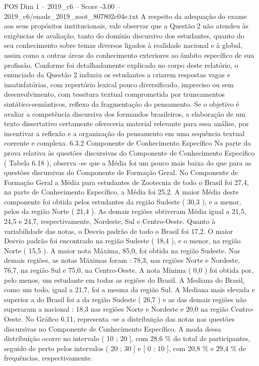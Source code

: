 \begin{textsample}{POS Dim 1 – 2019\_c6 – Score -3.00 – 2019\_c6/enade\_2019\_zoot\_807802c04e.txt}
A respeito da adequação do exame aos seus propósitos institucionais, vale observar que a Questão 2 não atendeu às exigências de avaliação, tanto do domínio discursivo dos estudantes, quanto do seu conhecimento sobre temas diversos ligados à realidade nacional e à global, assim como a outras áreas do conhecimento exteriores ao âmbito específico de sua profissão.
Conforme foi detalhadamente explicado no corpo deste relatório, o enunciado da Questão 2 induziu os estudantes a criarem respostas vagas e insatisfatórias, com repertório lexical pouco diversificado, impreciso ou sem desenvolvimento, com tessitura textual comprometida por truncamentos sintático-semânticos, reflexo da fragmentação do pensamento.
Se o objetivo é avaliar a competência discursiva dos formandos brasileiros, a elaboração de um texto dissertativo certamente ofereceria material relevante para essa análise, por incentivar a reflexão e a organização do pensamento em uma sequência textual coerente e complexa. 6.3.2 Componente de Conhecimento Específico Na parte da prova relativa às questões discursivas do Componente de Conhecimento Específico ( Tabela 6.18 ), observa -se que a Média foi um pouco mais baixa do que para as questões discursivas do Componente de Formação Geral.
No Componente de Formação Geral a Média para estudantes de Zootecnia de todo o Brasil foi 27,4, na parte de Conhecimento Específico, a Média foi 25,2.
A maior Média deste componente foi obtida pelos estudantes da região Sudeste ( 30,3 ), e a menor, pelos da região Norte ( 21,4 ).
As demais regiões obtiveram Média igual a 21,5, 24,5 e 24,7, respectivamente, Nordeste, Sul e Centro-Oeste.
Quanto à variabilidade das notas, o Desvio padrão de todo o Brasil foi 17,2.
O maior Desvio padrão foi encontrado na região Sudeste ( 18,4 ), e o menor, na região Norte ( 15,5 ).
A maior nota Máxima, 85,0, foi obtida na região Sudeste.
Nas demais regiões, as notas Máximas foram : 78,3, nas regiões Norte e Nordeste, 76,7, na região Sul e 75,0, na Centro-Oeste.
A nota Mínima ( 0,0 ) foi obtida por, pelo menos, um estudante em todas as regiões do Brasil.
A Mediana do Brasil, como um todo, igual a 21,7, foi a mesma da região Sul.
A Mediana mais elevada e superior a do Brasil foi a da região Sudeste ( 26,7 ) e as das demais regiões não superaram a nacional : 18,3 nas regiões Norte e Nordeste e 20,0 na região Centro-Oeste.
No Gráfico 6.11, representa -se a distribuição das notas nas questões discursivas no Componente de Conhecimento Específico.
A moda dessa distribuição ocorre no intervalo ( 10 ; 20 ], com 28,6 \% do total de participantes, seguido de perto pelos intervalos ( 20 ; 30 ] e [ 0 ; 10 ], com 20,8 \% e 29,4 \% de frequências, respectivamente.

\end{textsample}
